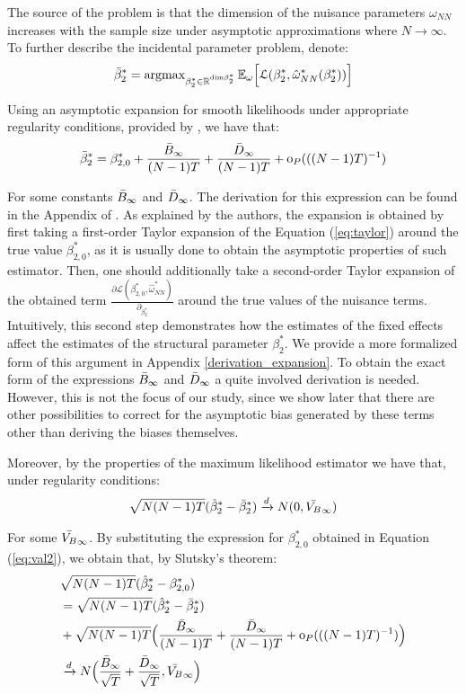 The source of the problem is that the dimension of the nuisance parameters $\omega_{NN}$ increases with the sample size under asymptotic approximations where $N \xrightarrow{} \infty$. To further describe the incidental parameter problem, denote:
$$\Bar{\beta}^*_2 = \operatorname{argmax}_{\beta^*_2 \in \mathbb{R}^{\text{dim} \beta^*_2}} \mathbb{E}_\omega \Big[\mathcal{L} (\beta^*_2, \hat{\omega}_{NN}^*(\beta^*_2)) \Big]$$

Using an asymptotic expansion for smooth likelihoods under appropriate regularity conditions, provided by \cite{fernandez2016individual}, we have that:
\begin{align} \label{eq:val2}
    \Bar{\beta}_2^* = \beta_{2,0}^* + \frac{\Bar{B}_\infty}{(N-1)T} + \frac{\Bar{D}_\infty}{(N-1)T} + \text{o}_P(((N-1)T)^{-1})
\end{align}

For some constants $\Bar{B}_\infty$ and $\Bar{D}_\infty$. The derivation for this expression can be found in the Appendix of \cite{fernandez2016individual}. As explained by the authors, the expansion is obtained by first taking a first-order Taylor expansion of the Equation (\ref{eq:taylor}) around the true value $\beta_{2,0}^*$, as it is usually done to obtain the asymptotic properties of such estimator. Then, one should additionally take a second-order Taylor expansion of the obtained term $\frac{\partial \mathcal{L} (\beta_{2,0}^*, \hat{\omega}^*_{NN})}{\partial_{\beta_2^*}}$ around the true values of the nuisance terms. Intuitively, this second step demonstrates how the estimates of the fixed effects affect the estimates of the structural parameter $\beta_{2}^*$. We provide a more formalized form of this argument in Appendix \ref{derivation_expansion}. To obtain the exact form of the expressions $\Bar{B}_\infty$ and $\Bar{D}_\infty$ a quite involved derivation is needed. However, this is not the focus of our study, since we show later that there are other possibilities to correct for the asymptotic bias generated by these terms other than deriving the biases themselves. 

Moreover, by the properties of the maximum likelihood estimator we have that, under regularity conditions:
\begin{align}
    \sqrt{N(N-1)T} (\hat{\beta}_2^* - \Bar{\beta}_2^*) \xrightarrow{d} N(0, \Bar{V_B}_\infty)
\end{align}

For some $\Bar{V_B}_\infty$. By substituting the expression for $\beta_{2,0}^*$ obtained in Equation (\ref{eq:val2}), we obtain that, by Slutsky's theorem:
\begin{align} \label{eq:val3}
    &\sqrt{N(N-1)T} (\hat{\beta}_2^* - \beta_{2,0}^*) \\ &=\sqrt{N(N-1)T} ( \hat{\beta}_2^* - \Bar{\beta}_{2}^*) \nonumber \\ 
    &+ \sqrt{N(N-1)T} \Big( \frac{\Bar{B}_\infty}{(N-1)T} + \frac{\Bar{D}_\infty}{(N-1)T} + \text{o}_P(((N-1)T)^{-1}) \Big) \nonumber\\
    &\xrightarrow{d} N\Big( \frac{\Bar{B}_\infty}{\sqrt{T}} + \frac{\Bar{D}_\infty}{\sqrt{T}}, \Bar{V_B}_\infty\Big) \nonumber
\end{align}


